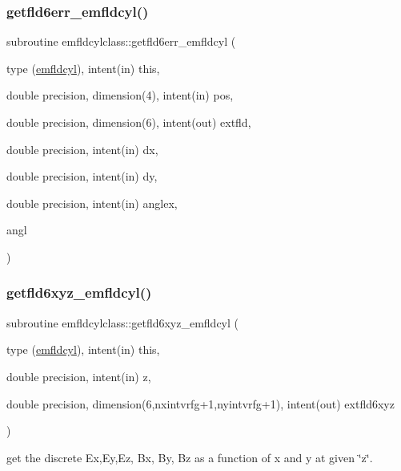 \subsubsection{\texorpdfstring{getfld6err\_emfldcyl()}{getfld6err\_emfldcyl()}}
{\footnotesize\ttfamily subroutine emfldcylclass\+::getfld6err\+\_\+emfldcyl (\begin{DoxyParamCaption}\item[{type (\mbox{\hyperlink{namespaceemfldcylclass_structemfldcylclass_1_1emfldcyl}{emfldcyl}}), intent(in)}]{this,  }\item[{double precision, dimension(4), intent(in)}]{pos,  }\item[{double precision, dimension(6), intent(out)}]{extfld,  }\item[{double precision, intent(in)}]{dx,  }\item[{double precision, intent(in)}]{dy,  }\item[{double precision, intent(in)}]{anglex,  }\item[{}]{angl }\end{DoxyParamCaption})}

\mbox{\label{namespaceemfldcylclass_a6e565db42720101fd24fc991842be210}} 
\subsubsection{\texorpdfstring{getfld6xyz\_emfldcyl()}{getfld6xyz\_emfldcyl()}}
{\footnotesize\ttfamily subroutine emfldcylclass\+::getfld6xyz\+\_\+emfldcyl (\begin{DoxyParamCaption}\item[{type (\mbox{\hyperlink{namespaceemfldcylclass_structemfldcylclass_1_1emfldcyl}{emfldcyl}}), intent(in)}]{this,  }\item[{double precision, intent(in)}]{z,  }\item[{double precision, dimension(6,nxintvrfg+1,nyintvrfg+1), intent(out)}]{extfld6xyz }\end{DoxyParamCaption})}



get the discrete Ex,Ey,Ez, Bx, By, Bz as a function of x and y at given \char`\"{}z\char`\"{}. 

\mbox{\label{namespaceemfldcylclass_a36c2a6787aeb8c71d2f4886e40e2e0e2}} 
